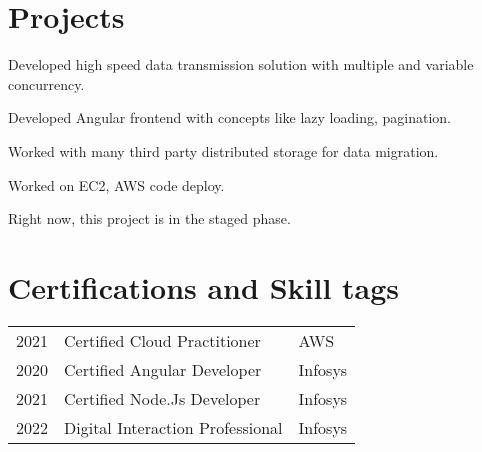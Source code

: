 \documentclass[]{deedy-resume-openfont}
\begin{document}
\begin{minipage}[t]{0.66\textwidth}
\section{Projects}

\begin{tightemize}
\item Developed high speed data transmission solution with multiple and variable concurrency.
\item Developed Angular frontend with concepts like lazy loading, pagination.
\item Worked with many third party distributed storage for data migration.
\item Worked on EC2, AWS code deploy.
\item Right now, this project is in the staged phase.
\end{tightemize}
\sectionsep




\section{Certifications and Skill tags} 

\begin{tabular}{rll}
2021 	& Certified Cloud Practitioner    & AWS\\
2020   & Certified Angular Developer   & Infosys\\
2021   & Certified Node.Js Developer  & Infosys\\
2022    & Digital Interaction Professional & Infosys\\

\end{tabular}
\sectionsep

\end{minipage} 
\end{document}
